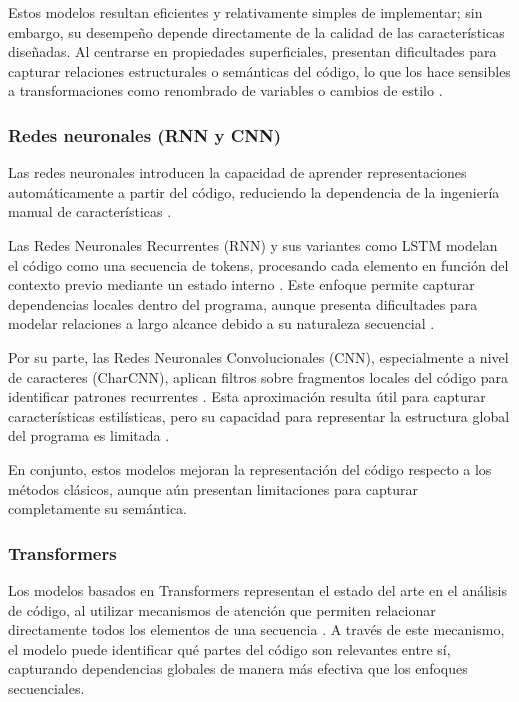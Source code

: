 Estos modelos resultan eficientes y relativamente simples de implementar; sin embargo, su desempeño depende directamente de la calidad de las características diseñadas. Al centrarse en propiedades superficiales, presentan dificultades para capturar relaciones estructurales o semánticas del código, lo que los hace sensibles a transformaciones como renombrado de variables o cambios de estilo \cite{aiai2024proceedings}.

\subsubsection{Redes neuronales (RNN y CNN)}

Las redes neuronales introducen la capacidad de aprender representaciones automáticamente a partir del código, reduciendo la dependencia de la ingeniería manual de características \cite{Alon2018Code2Vec}.

Las Redes Neuronales Recurrentes (RNN) y sus variantes como LSTM modelan el código como una secuencia de tokens, procesando cada elemento en función del contexto previo mediante un estado interno \cite{Chung2014Empirical}. Este enfoque permite capturar dependencias locales dentro del programa, aunque presenta dificultades para modelar relaciones a largo alcance debido a su naturaleza secuencial \cite{Le2021DeepLearning}.

Por su parte, las Redes Neuronales Convolucionales (CNN), especialmente a nivel de caracteres (CharCNN), aplican filtros sobre fragmentos locales del código para identificar patrones recurrentes \cite{Zhang2015CharCNN}. Esta aproximación resulta útil para capturar características estilísticas, pero su capacidad para representar la estructura global del programa es limitada \cite{Le2021DeepLearning}.

En conjunto, estos modelos mejoran la representación del código respecto a los métodos clásicos, aunque aún presentan limitaciones para capturar completamente su semántica.

\subsubsection{Transformers}

Los modelos basados en Transformers representan el estado del arte en el análisis de código, al utilizar mecanismos de atención que permiten relacionar directamente todos los elementos de una secuencia \cite{Vaswani2017Attention}. A través de este mecanismo, el modelo puede identificar qué partes del código son relevantes entre sí, capturando dependencias globales de manera más efectiva que los enfoques secuenciales.

